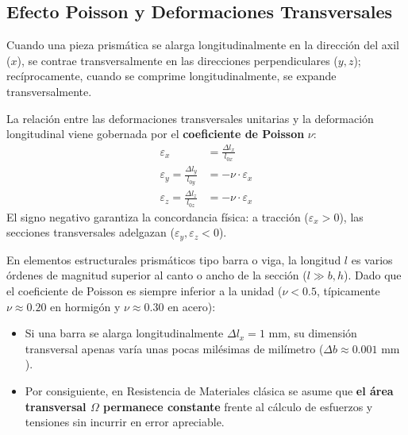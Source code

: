 \subsection{Efecto Poisson y Deformaciones Transversales}

Cuando una pieza prismática se alarga longitudinalmente en la dirección del axil ($x$), se contrae transversalmente en las direcciones perpendiculares ($y, z$); recíprocamente, cuando se comprime longitudinalmente, se expande transversalmente.

La relación entre las deformaciones transversales unitarias y la deformación longitudinal viene gobernada por el \textbf{coeficiente de Poisson} $\nu$:
\begin{align}
    \varepsilon_x                             & = \frac{\Delta l_x}{l_{0x}} \\
    \varepsilon_y = \frac{\Delta l_y}{l_{0y}} & = - \nu \cdot \varepsilon_x \\
    \varepsilon_z = \frac{\Delta l_z}{l_{0z}} & = - \nu \cdot \varepsilon_x
\end{align}
El signo negativo garantiza la concordancia física: a tracción ($\varepsilon_x > 0$), las secciones transversales adelgazan ($\varepsilon_y, \varepsilon_z < 0$).

\begin{ImportanteBox}[title={¿Por qué se desprecia el efecto Poisson en el cálculo de vigas y barras?}]
    En elementos estructurales prismáticos tipo barra o viga, la longitud $l$ es varios órdenes de magnitud superior al canto o ancho de la sección ($l \gg b, h$). Dado que el coeficiente de Poisson es siempre inferior a la unidad ($\nu < 0.5$, típicamente $\nu \approx 0.20$ en hormigón y $\nu \approx 0.30$ en acero):
    \begin{itemize}
        \item Si una barra se alarga longitudinalmente $\Delta l_x = 1\text{ mm}$, su dimensión transversal apenas varía unas pocas milésimas de milímetro ($\Delta b \approx 0.001\text{ mm}$).
        \item Por consiguiente, en Resistencia de Materiales clásica se asume que \textbf{el área transversal $\Omega$ permanece constante} frente al cálculo de esfuerzos y tensiones sin incurrir en error apreciable.
    \end{itemize}
\end{ImportanteBox}

